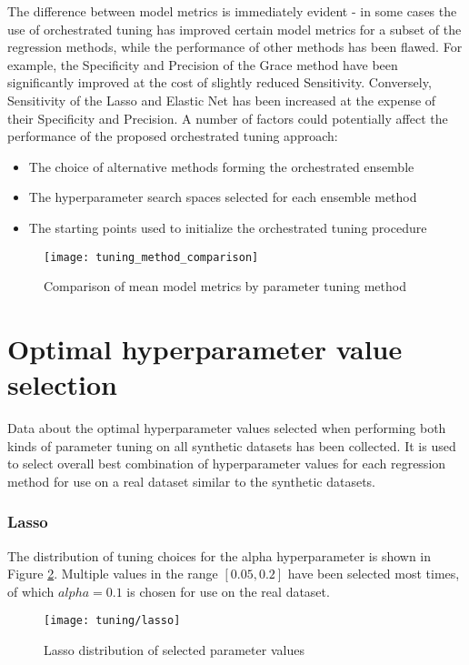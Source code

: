 

The difference between model metrics is immediately evident - in some cases the use of orchestrated tuning has improved certain model metrics for a subset of the regression methods, while the performance of other methods has been flawed. For example, the Specificity and Precision of the Grace method have been significantly improved at the cost of slightly reduced Sensitivity. Conversely, Sensitivity of the Lasso and Elastic Net has been increased at the expense of their Specificity and Precision. A number of factors could potentially affect the performance of the proposed orchestrated tuning approach:
\begin{itemize}
	\item The choice of alternative methods forming the orchestrated ensemble
	\item The hyperparameter search spaces selected for each ensemble method
	\item The starting points used to initialize the orchestrated tuning procedure
\end{itemize}

\begin{figure}[H]
	\centering
	\texttt{[image: tuning\_method\_comparison]}
	\caption{Comparison of mean model metrics by parameter tuning method}
	\label{fig:met_comp}
\end{figure}

\section{Optimal hyperparameter value selection}
Data about the optimal hyperparameter values selected when performing both kinds of parameter tuning on all synthetic datasets has been collected. It is used to select overall best combination of hyperparameter values for each regression method for use on a real dataset similar to the synthetic datasets.

\subsubsection{Lasso}
The distribution of tuning choices for the alpha hyperparameter is shown in Figure \ref{fig:tun_lasso}. Multiple values in the range $[0.05, 0.2]$ have been selected most times, of which $alpha = 0.1$ is chosen for use on the real dataset.
\begin{figure}[H]
	\centering
	\texttt{[image: tuning/lasso]}
	\caption{Lasso distribution of selected parameter values}
	\label{fig:tun_lasso}
\end{figure}

